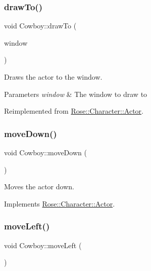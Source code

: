 \subsubsection{\texorpdfstring{drawTo()}{drawTo()}}
{\footnotesize\ttfamily void Cowboy\+::draw\+To (\begin{DoxyParamCaption}\item[{sf\+::\+Render\+Window \&}]{window }\end{DoxyParamCaption})\hspace{0.3cm}{\ttfamily [virtual]}}



Draws the actor to the window. 


\begin{DoxyParams}{Parameters}
{\em window} & The window to draw to \\
\hline
\end{DoxyParams}


Reimplemented from \mbox{\hyperlink{classRose_1_1Character_1_1Actor_a1433ef76e892a8c57597115071c256d8}{Rose\+::\+Character\+::\+Actor}}.

\mbox{\label{classCowboy_a25b9c66203a4a5e762984ca0bed511e0}} 
\subsubsection{\texorpdfstring{moveDown()}{moveDown()}}
{\footnotesize\ttfamily void Cowboy\+::move\+Down (\begin{DoxyParamCaption}{ }\end{DoxyParamCaption})\hspace{0.3cm}{\ttfamily [virtual]}}



Moves the actor down. 



Implements \mbox{\hyperlink{classRose_1_1Character_1_1Actor_a3ccb744404ed29c77fe9420f274a6826}{Rose\+::\+Character\+::\+Actor}}.

\mbox{\label{classCowboy_a487cf6b5d1e37586e6e9b408d2aaad1a}} 
\subsubsection{\texorpdfstring{moveLeft()}{moveLeft()}}
{\footnotesize\ttfamily void Cowboy\+::move\+Left (\begin{DoxyParamCaption}{ }\end{DoxyParamCaption})\hspace{0.3cm}{\ttfamily [virtual]}}



